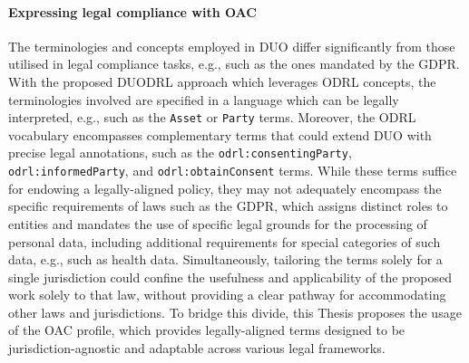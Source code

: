 \begin{table}[ht]
\centering
\caption{Examples of outcomes of the policy matching algorithm for DUODRL.}
\label{tab:duodrl_matching_examples}
\end{table}

\paragraph{Expressing legal compliance with OAC}
The terminologies and concepts employed in DUO differ significantly from those utilised in legal compliance tasks, e.g., such as the ones mandated by the GDPR.
With the proposed DUODRL approach which leverages ODRL concepts, the terminologies involved are specified in a language which can be legally interpreted, e.g., such as the \texttt{Asset} or \texttt{Party} terms.
Moreover, the ODRL vocabulary encompasses complementary terms that could extend DUO with precise legal annotations, such as the \texttt{odrl:consentingParty}, \texttt{odrl:informedParty}, and \texttt{odrl:obtainConsent} terms.
While these terms suffice for endowing a legally-aligned policy, they may not adequately encompass the specific requirements of laws such as the GDPR, which assigns distinct roles to entities and mandates the use of specific legal grounds for the processing of personal data, including additional requirements for special categories of such data, e.g., such as health data.
Simultaneously, tailoring the terms solely for a single jurisdiction could confine the usefulness and applicability of the proposed work solely to that law, without providing a clear pathway for accommodating other laws and jurisdictions.
To bridge this divide, this Thesis proposes the usage of the OAC profile, which provides legally-aligned terms designed to be jurisdiction-agnostic and adaptable across various legal frameworks.

